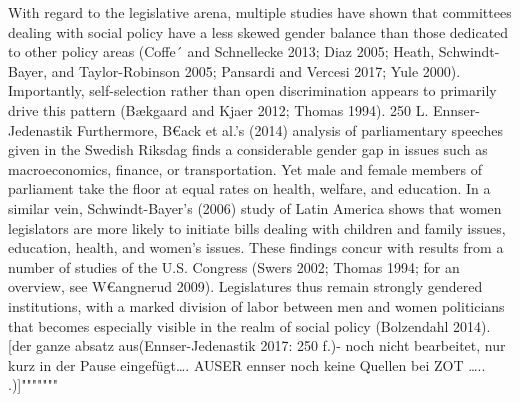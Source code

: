 \documentclass[12pt, 
    twoside=false, 
    bibliography=totoc, 
    numbers=endperiod, 
    headings=normal, 
    toc=chapterentrydotfill
    ]{scrbook}
\begin{document}
With regard to the legislative arena, multiple studies have shown that committees
dealing with social policy have a less skewed gender balance than those
dedicated to other policy areas (Coffe´ and Schnellecke 2013; Diaz 2005; Heath,
Schwindt-Bayer, and Taylor-Robinson 2005; Pansardi and Vercesi 2017; Yule
2000). Importantly, self-selection rather than open discrimination appears to
primarily drive this pattern (Bækgaard and Kjaer 2012; Thomas 1994).
250 L. Ennser-Jedenastik Furthermore, B€ack et al.’s (2014) analysis of parliamentary speeches given
in the Swedish Riksdag finds a considerable gender gap in issues such as
macroeconomics, finance, or transportation. Yet male and female members of
parliament take the floor at equal rates on health, welfare, and education. In a
similar vein, Schwindt-Bayer’s (2006) study of Latin America shows that
women legislators are more likely to initiate bills dealing with children and
family issues, education, health, and women’s issues. These findings concur
with results from a number of studies of the U.S. Congress (Swers 2002;
Thomas 1994; for an overview, see W€angnerud 2009). Legislatures thus remain
strongly gendered institutions, with a marked division of labor between
men and women politicians that becomes especially visible in the realm of social
policy (Bolzendahl 2014). [der ganze absatz aus(Ennser-Jedenastik 2017: 250 f.)- noch nicht bearbeitet, nur kurz in der Pause eingefügt…. AUSER ennser noch keine Quellen bei ZOT ….. .)]"""""""
\end{document}
